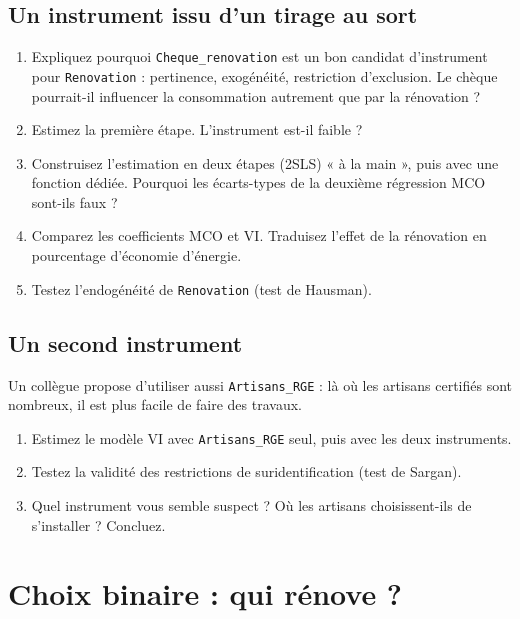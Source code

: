 \documentclass[11pt,a4paper]{article}
\newcommand{\var}[1]{\texttt{#1}}
\begin{document}
\subsection{Un instrument issu d'un tirage au sort}
\begin{enumerate}
  \item Expliquez pourquoi \var{Cheque\_renovation} est un bon candidat d'instrument pour \var{Renovation} : pertinence, exogénéité, restriction d'exclusion. Le chèque pourrait-il influencer la consommation autrement que par la rénovation ?
  \item Estimez la première étape. L'instrument est-il faible ?
  \item Construisez l'estimation en deux étapes (2SLS) « à la main », puis avec une fonction dédiée. Pourquoi les écarts-types de la deuxième régression MCO sont-ils faux ?
  \item Comparez les coefficients MCO et VI. Traduisez l'effet de la rénovation en pourcentage d'économie d'énergie.
  \item Testez l'endogénéité de \var{Renovation} (test de Hausman).
\end{enumerate}

\subsection{Un second instrument}
Un collègue propose d'utiliser aussi \var{Artisans\_RGE} : là où les artisans certifiés sont nombreux, il est plus facile de faire des travaux.
\begin{enumerate}
  \item Estimez le modèle VI avec \var{Artisans\_RGE} seul, puis avec les deux instruments.
  \item Testez la validité des restrictions de suridentification (test de Sargan).
  \item Quel instrument vous semble suspect ? Où les artisans choisissent-ils de s'installer ? Concluez.
\end{enumerate}

\section{Choix binaire : qui rénove ?}
\end{document}
